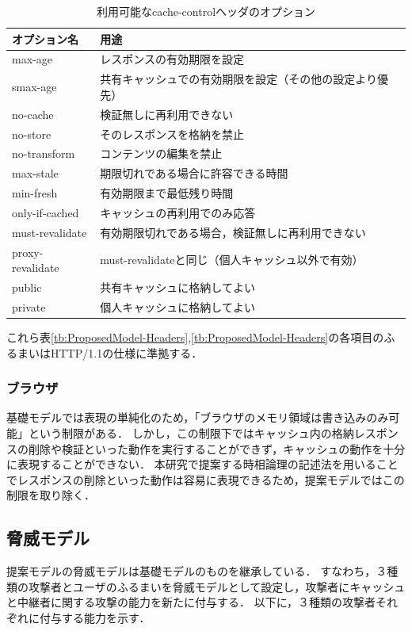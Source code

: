 \documentclass[12pt,a4paper]{jbook}
\begin{document}
\begin{table}[htb]
\centering
\caption{利用可能なcache-controlヘッダのオプション}
\label{tb:CacheControlOption}
\begin{tabular}{ll}
\hline
オプション名 & 用途 \\
\hline
max-age & レスポンスの有効期限を設定 \\
smax-age & 共有キャッシュでの有効期限を設定（その他の設定より優先） \\
no-cache & 検証無しに再利用できない \\
no-store & そのレスポンスを格納を禁止 \\
no-transform & コンテンツの編集を禁止 \\
max-stale & 期限切れである場合に許容できる時間 \\
min-fresh & 有効期限まで最低残り時間 \\
only-if-cached & キャッシュの再利用でのみ応答 \\
must-revalidate & 有効期限切れである場合，検証無しに再利用できない \\
proxy-revalidate & must-revalidateと同じ（個人キャッシュ以外で有効） \\
public & 共有キャッシュに格納してよい \\
private & 個人キャッシュに格納してよい \\
\hline
\end{tabular}
\end{table}

これら表\ref{tb:ProposedModel-Headers},\ref{tb:ProposedModel-Headers}の各項目のふるまいはHTTP/1.1の仕様に準拠する．

\subsubsection{ブラウザ}
基礎モデルでは表現の単純化のため，「ブラウザのメモリ領域は書き込みのみ可能」という制限がある．
しかし，この制限下ではキャッシュ内の格納レスポンスの削除や検証といった動作を実行することができず，キャッシュの動作を十分に表現することができない．
本研究で提案する時相論理の記述法を用いることでレスポンスの削除といった動作は容易に表現できるため，提案モデルではこの制限を取り除く．

\subsection{脅威モデル}
提案モデルの脅威モデルは基礎モデルのものを継承している．
すなわち，３種類の攻撃者とユーザのふるまいを脅威モデルとして設定し，攻撃者にキャッシュと中継者に関する攻撃の能力を新たに付与する．
以下に，３種類の攻撃者それぞれに付与する能力を示す．
\end{document}
